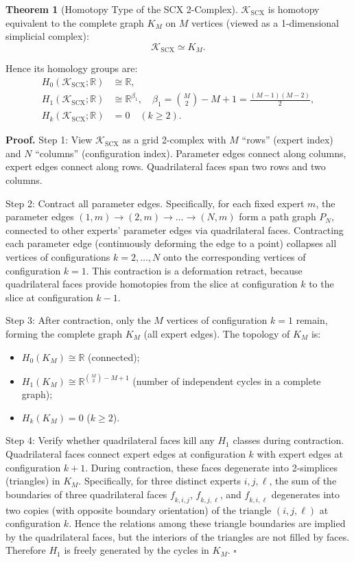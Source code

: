 \documentclass[12pt,a4paper]{article}
\theoremstyle{definition}
\newtheorem{theorem}{Theorem}[section]
\theoremstyle{remark}
\theoremstyle{definition}
\newcommand{\R}{\mathbb{R}}
\newcommand{\face}{\ensuremath{\mathit{f}}}
\newcommand{\ZBetti}{\beta_1}
\begin{document}
\begin{theorem}[Homotopy Type of the SCX 2-Complex]\label{thm:scx_homotopy}
$\mathcal{K}_{\text{SCX}}$ is homotopy equivalent to the complete graph $K_M$ on $M$ vertices (viewed as a 1-dimensional simplicial complex):
\[
    \mathcal{K}_{\text{SCX}} \simeq K_M.
\]

Hence its homology groups are:
\begin{align*}
    H_0(\mathcal{K}_{\text{SCX}}; \R) &\cong \R, \\
    H_1(\mathcal{K}_{\text{SCX}}; \R) &\cong \R^{\ZBetti}, \quad
    \ZBetti = \binom{M}{2} - M + 1 = \frac{(M-1)(M-2)}{2}, \\
    H_k(\mathcal{K}_{\text{SCX}}; \R) &= 0 \quad (k \geq 2).
\end{align*}

\textbf{Proof.}
Step 1: View $\mathcal{K}_{\text{SCX}}$ as a grid 2-complex with $M$ ``rows'' (expert index) and $N$ ``columns'' (configuration index).
Parameter edges connect along columns, expert edges connect along rows.
Quadrilateral faces span two rows and two columns.

Step 2: Contract all parameter edges. Specifically, for each fixed expert $m$, the parameter edges $(1,m) \to (2,m) \to \dots \to (N,m)$
form a path graph $P_N$, connected to other experts' parameter edges via quadrilateral faces.
Contracting each parameter edge (continuously deforming the edge to a point) collapses all vertices of configurations $k=2,\dots,N$ onto the corresponding vertices of configuration $k=1$.
This contraction is a deformation retract, because quadrilateral faces provide homotopies from the slice at configuration $k$ to the slice at configuration $k-1$.

Step 3: After contraction, only the $M$ vertices of configuration $k=1$ remain, forming the complete graph $K_M$ (all expert edges).
The topology of $K_M$ is:
\begin{itemize}
    \item $H_0(K_M) \cong \R$ (connected);
    \item $H_1(K_M) \cong \R^{\binom{M}{2} - M + 1}$ (number of independent cycles in a complete graph);
    \item $H_k(K_M) = 0$ ($k \geq 2$).
\end{itemize}

Step 4: Verify whether quadrilateral faces kill any $H_1$ classes during contraction. Quadrilateral faces connect expert edges at configuration $k$ with expert edges at configuration $k+1$.
During contraction, these faces degenerate into 2-simplices (triangles) in $K_M$.
Specifically, for three distinct experts $i, j, \ell$, the sum of the boundaries of three quadrilateral faces $\face_{k,i,j}$, $\face_{k,j,\ell}$, and $\face_{k,i,\ell}$
degenerates into two copies (with opposite boundary orientation) of the triangle $(i,j,\ell)$ at configuration $k$.
Hence the relations among these triangle boundaries are implied by the quadrilateral faces, but the interiors of the triangles are not filled by faces.
Therefore $H_1$ is freely generated by the cycles in $K_M$. $\square$
\end{theorem}
\end{document}
